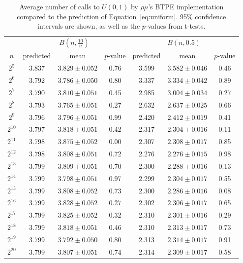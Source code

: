 \begin{table}[t]
\centering
\caption{Average number of calls to $U(0,1)$ by $\rho\mu$'s BTPE implementation
compared to the prediction of Equation~\ref{eq:uniform}. 95\% confidence intervals
are shown, as well as the $p$-values from t-tests.}\label{fig:results}
\begin{tabular}{c|ccc|ccc}\hline
    & \multicolumn{3}{|c}{$B(n,\frac{10}{n})$} & \multicolumn{3}{|c}{$B(n,0.5)$} \\
$n$ & predicted & mean & $p$-value & predicted & mean & $p$-value \\\hline
$2^{5}$ & 3.837 & $3.829 \pm 0.052$ & 0.76 & 3.599 & $3.582 \pm 0.046$ & 0.46 \\
$2^{6}$ & 3.792 & $3.786 \pm 0.050$ & 0.80 & 3.337 & $3.334 \pm 0.042$ & 0.89 \\
$2^{7}$ & 3.790 & $3.810 \pm 0.051$ & 0.45 & 2.985 & $3.004 \pm 0.034$ & 0.27 \\
$2^{8}$ & 3.793 & $3.765 \pm 0.051$ & 0.27 & 2.632 & $2.637 \pm 0.025$ & 0.66 \\
$2^{9}$ & 3.796 & $3.796 \pm 0.051$ & 0.99 & 2.420 & $2.412 \pm 0.019$ & 0.41 \\
$2^{10}$ & 3.797 & $3.818 \pm 0.051$ & 0.42 & 2.317 & $2.304 \pm 0.016$ & 0.11 \\
$2^{11}$ & 3.798 & $3.875 \pm 0.052$ & 0.00 & 2.307 & $2.308 \pm 0.017$ & 0.85 \\
$2^{12}$ & 3.798 & $3.808 \pm 0.051$ & 0.72 & 2.276 & $2.276 \pm 0.015$ & 0.98 \\
$2^{13}$ & 3.799 & $3.809 \pm 0.051$ & 0.70 & 2.300 & $2.288 \pm 0.016$ & 0.13 \\
$2^{14}$ & 3.799 & $3.798 \pm 0.051$ & 0.97 & 2.299 & $2.304 \pm 0.017$ & 0.55 \\
$2^{15}$ & 3.799 & $3.808 \pm 0.052$ & 0.73 & 2.300 & $2.286 \pm 0.016$ & 0.08 \\
$2^{16}$ & 3.799 & $3.828 \pm 0.052$ & 0.27 & 2.302 & $2.306 \pm 0.017$ & 0.65 \\
$2^{17}$ & 3.799 & $3.825 \pm 0.052$ & 0.32 & 2.310 & $2.301 \pm 0.016$ & 0.29 \\
$2^{18}$ & 3.799 & $3.818 \pm 0.051$ & 0.46 & 2.310 & $2.313 \pm 0.017$ & 0.73 \\
$2^{19}$ & 3.799 & $3.792 \pm 0.050$ & 0.80 & 2.313 & $2.314 \pm 0.017$ & 0.91 \\
$2^{20}$ & 3.799 & $3.807 \pm 0.051$ & 0.74 & 2.314 & $2.309 \pm 0.017$ & 0.58 \\
\hline
\end{tabular}
\end{table}
